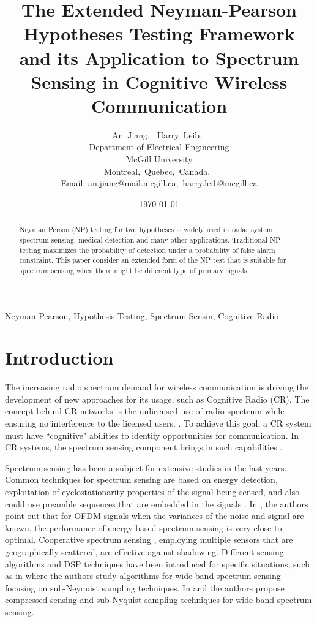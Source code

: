 \documentclass[12pt,journal,a4paper,twoside,onecolumn]{IEEEtran}
\author{An~Jiang,~
        Harry~Leib,~\\
          Department of Electrical Engineering\\
          McGill University\\
          Montreal,~Quebec,~Canada,~\\
          Email: an.jiang@mail.mcgill.ca,~harry.leib@mcgill.ca
}
\title{The Extended Neyman-Pearson Hypotheses Testing Framework and its Application to Spectrum Sensing in Cognitive Wireless Communication}
\date{\today}
\begin{document}
\begin{spacing}{2.5}
\maketitle
\begin{abstract}
Neyman Person (NP) testing for two hypotheses is widely used in radar system, spectrum sensing, medical detection and many other applications. Traditional NP testing maximizes the probability of detection under a probability of false alarm constraint. This paper consider an extended form of the NP test that is suitable for spectrum sensing when there might be different type of primary signals.
\end{abstract}

\begin{IEEEkeywords}
Neyman Pearson, Hypothesis Testing, Spectrum Sensin, Cognitive Radio
\end{IEEEkeywords}

\section{Introduction}
The increasing radio spectrum demand for wireless communication is driving the development of new approaches for its usage, such as Cognitive Radio (CR)\cite{a001}. The concept behind CR networks is the unlicensed use of radio spectrum while ensuring no interference to the licensed users. \cite{goldsmith2009breaking}.
To achieve this goal, a CR system must have ``cognitive" abilities to identify opportunities for communication\cite{buddhikot2007understanding}. In CR systems, the spectrum sensing component brings in such capabilities \cite{tandra2009spectrum}.

 Spectrum sensing has been a subject for extensive studies in the last years\cite{axell2012spectrum}. Common techniques for spectrum sensing are based on energy detection, exploitation of cyclostationarity properties of  the signal being sensed, and also could use preamble sequences that are embedded in the signals \cite{cabric2004implementation}.  In \cite{axell2011optimal}, the authors point out that for OFDM signals when the variances of the noise and signal are known, the performance of energy based spectrum sensing is very close to optimal. Cooperative spectrum sensing \cite{ganesan2005cooperative}, employing multiple sensors that are geographically scattered, are effective against shadowing.
Different sensing algorithms and DSP techniques have been introduced for specific situations, such as in \cite{tian2007compressed} where the authors study algorithms for wide band spectrum sensing focusing on sub-Neyquist sampling techniques. In  \cite{sun2013wideband} and  \cite{sun2013wideband2} the authors propose compressed sensing and sub-Nyquist sampling techniques for wide band spectrum sensing.


\end{spacing}
\end{document}
